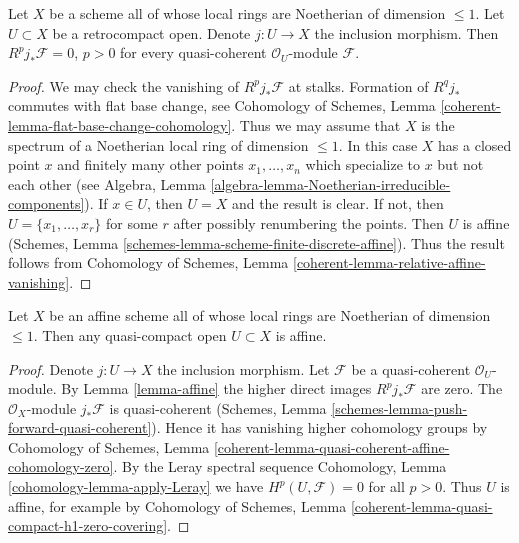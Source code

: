 \begin{lemma}
\label{lemma-affine}
Let $X$ be a scheme all of whose local rings are Noetherian of dimension
$\leq 1$. Let $U \subset X$ be a retrocompact open. Denote
$j : U \to X$ the inclusion morphism. Then $R^pj_*\mathcal{F} = 0$, $p > 0$
for every quasi-coherent $\mathcal{O}_U$-module $\mathcal{F}$.
\end{lemma}

\begin{proof}
We may check the vanishing of $R^pj_*\mathcal{F}$ at stalks.
Formation of $R^qj_*$ commutes with flat base change, see
Cohomology of Schemes, Lemma
\ref{coherent-lemma-flat-base-change-cohomology}.
Thus we may assume that $X$ is the spectrum of a Noetherian local
ring of dimension $\leq 1$. In this case $X$ has a closed point
$x$ and finitely many other points $x_1, \ldots, x_n$ which specialize
to $x$ but not each other (see
Algebra, Lemma \ref{algebra-lemma-Noetherian-irreducible-components}).
If $x \in U$, then $U = X$ and the result is clear. If not, then
$U = \{x_1, \ldots, x_r\}$ for some $r$ after possibly renumbering
the points. Then $U$ is affine
(Schemes, Lemma \ref{schemes-lemma-scheme-finite-discrete-affine}).
Thus the result follows from Cohomology of Schemes, Lemma
\ref{coherent-lemma-relative-affine-vanishing}.
\end{proof}

\begin{lemma}
\label{lemma-open-in-affine-curve-affine}
Let $X$ be an affine scheme all of whose local rings are Noetherian
of dimension $\leq 1$. Then any quasi-compact open $U \subset X$ is affine.
\end{lemma}

\begin{proof}
Denote $j : U \to X$ the inclusion morphism. Let $\mathcal{F}$
be a quasi-coherent $\mathcal{O}_U$-module.
By Lemma \ref{lemma-affine} the higher direct images
$R^pj_*\mathcal{F}$ are zero. The $\mathcal{O}_X$-module $j_*\mathcal{F}$
is quasi-coherent
(Schemes, Lemma \ref{schemes-lemma-push-forward-quasi-coherent}).
Hence it has vanishing higher cohomology groups by
Cohomology of Schemes, Lemma
\ref{coherent-lemma-quasi-coherent-affine-cohomology-zero}.
By the Leray spectral sequence
Cohomology, Lemma \ref{cohomology-lemma-apply-Leray}
we have $H^p(U, \mathcal{F}) = 0$ for all $p > 0$.
Thus $U$ is affine, for example by
Cohomology of Schemes, Lemma
\ref{coherent-lemma-quasi-compact-h1-zero-covering}.
\end{proof}

